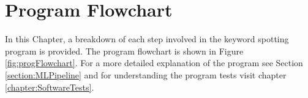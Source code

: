 %
%


\chapter{Program Flowchart}
\label{chapter:ProgramFlowchart}

In this Chapter, a breakdown of each step involved in the keyword spotting program is provided. The program flowchart is shown in Figure \ref{fig:progFlowchart}. For a more detailed explanation of the program see Section \ref{section:MLPipeline} and for understanding the program tests visit chapter \ref{chapter:SoftwareTests}.

